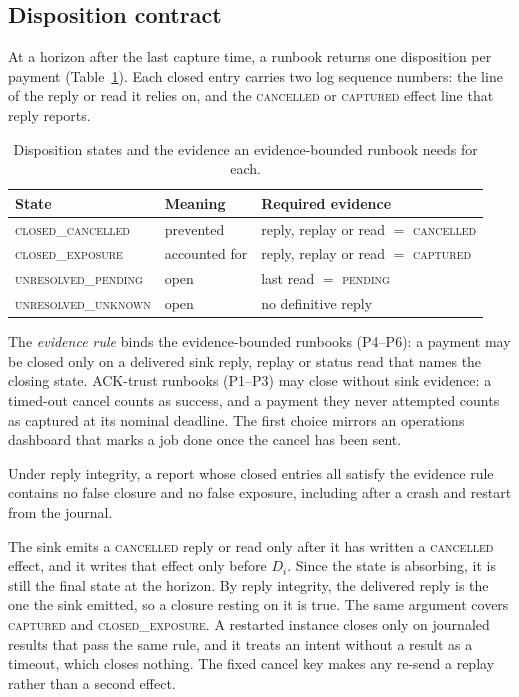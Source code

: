 \subsection{Disposition contract}\label{sec:model:contract}
At a horizon after the last capture time, a runbook returns one disposition per payment (Table~\ref{tab:states}). Each closed entry carries two log sequence numbers: the line of the reply or read it relies on, and the \textsc{cancelled} or \textsc{captured} effect line that reply reports.

\begin{table}[t]
\centering
\scriptsize
\caption{Disposition states and the evidence an evidence-bounded runbook needs for each.}
\label{tab:states}
\begin{tabular}{@{}lll@{}}
\toprule
State & Meaning & Required evidence \\
\midrule
\textsc{closed\_cancelled} & prevented & reply, replay or read $=$ \textsc{cancelled} \\
\textsc{closed\_exposure} & accounted for & reply, replay or read $=$ \textsc{captured} \\
\textsc{unresolved\_pending} & open & last read $=$ \textsc{pending} \\
\textsc{unresolved\_unknown} & open & no definitive reply \\
\bottomrule
\end{tabular}
\end{table}

The \emph{evidence rule} binds the evidence-bounded runbooks (P4--P6): a payment may be closed only on a delivered sink reply, replay or status read that names the closing state. ACK-trust runbooks (P1--P3) may close without sink evidence: a timed-out cancel counts as success, and a payment they never attempted counts as captured at its nominal deadline. The first choice mirrors an operations dashboard that marks a job done once the cancel has been sent.

\begin{proposition}\label{prop:evidence}
Under reply integrity, a report whose closed entries all satisfy the evidence rule contains no false closure and no false exposure, including after a crash and restart from the journal.
\end{proposition}

\begin{IEEEproof}
The sink emits a \textsc{cancelled} reply or read only after it has written a \textsc{cancelled} effect, and it writes that effect only before $D_i$. Since the state is absorbing, it is still the final state at the horizon. By reply integrity, the delivered reply is the one the sink emitted, so a closure resting on it is true. The same argument covers \textsc{captured} and \textsc{closed\_exposure}. A restarted instance closes only on journaled results that pass the same rule, and it treats an intent without a result as a timeout, which closes nothing. The fixed cancel key makes any re-send a replay rather than a second effect.
\end{IEEEproof}

